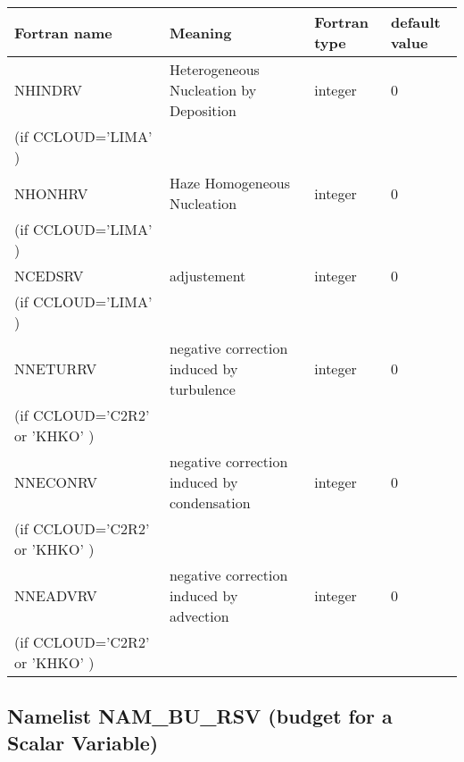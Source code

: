 \begin{center}
\begin{tabular} {|p{8cm}|p{4cm}|>{\centering}p{1.5cm}|p{1.5cm}<{\centering}|}
\hline
Fortran name & Meaning & Fortran type & default value \\
\hline\hline
NHINDRV   & Heterogeneous Nucleation by Deposition & integer  &  0 \index{NHINDRV!\innam{NAM\_BU\_RRV}}\\
(if CCLOUD='LIMA'  ) & &   &  \\\hline
NHONHRV   &Haze Homogeneous Nucleation  & integer  &  0 \index{NHONHRV!\innam{NAM\_BU\_RRV}}\\
(if CCLOUD='LIMA'  ) & &   &  \\\hline
NCEDSRV   & adjustement & integer  &  0 \index{NCEDSRV!\innam{NAM\_BU\_RRV}}\\
(if CCLOUD='LIMA'  ) & &   &  \\\hline
NNETURRV   & negative correction induced by turbulence & integer  &  0 \index{NNETURRV!\innam{NAM\_BU\_RRV}}\\
(if CCLOUD='C2R2' or 'KHKO'  ) & &   &  \\\hline
 NNECONRV  & negative correction induced by condensation & integer  &  0 \index{NNECONRV!\innam{NAM\_BU\_RRV}}\\
(if CCLOUD='C2R2' or 'KHKO'  ) & &   &  \\\hline
NNEADVRV&negative correction induced by advection  & integer  &  0 \index{NNEADVRV!\innam{NAM\_BU\_RRV}}\\
(if CCLOUD='C2R2' or 'KHKO'  ) & &   &  \\\hline
\end{tabular}
\end{center}
\subsection{Namelist NAM\_BU\_RSV (budget for a Scalar Variable)}

